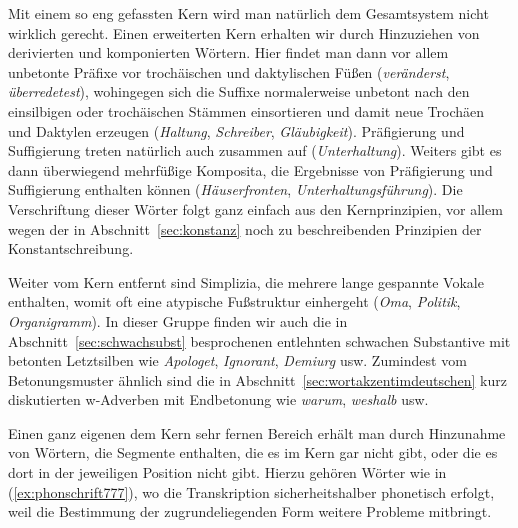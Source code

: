 Mit einem so eng gefassten Kern wird man natürlich dem Gesamtsystem nicht wirklich gerecht.
Einen erweiterten Kern erhalten wir durch Hinzuziehen von derivierten und komponierten Wörtern.
Hier findet man dann vor allem unbetonte Präfixe vor trochäischen und daktylischen Füßen (\textit{veränderst}, \textit{überredetest}), wohingegen sich die Suffixe normalerweise unbetont nach den einsilbigen oder trochäischen Stämmen einsortieren und damit neue Trochäen und Daktylen erzeugen (\textit{Haltung}, \textit{Schreiber}, \textit{Gläubigkeit}).
Präfigierung und Suffigierung treten natürlich auch zusammen auf (\textit{Unterhaltung}).
Weiters gibt es dann überwiegend mehrfüßige Komposita, die Ergebnisse von Präfigierung und Suffigierung enthalten können (\textit{Häuserfronten}, \textit{Unterhaltungsführung}).
Die Verschriftung dieser Wörter folgt ganz einfach aus den Kernprinzipien, vor allem wegen der in Abschnitt~\ref{sec:konstanz} noch zu beschreibenden Prinzipien der Konstantschreibung.

Weiter vom Kern entfernt sind Simplizia, die mehrere lange gespannte Vokale enthalten, womit oft eine atypische Fußstruktur einhergeht (\textit{Oma}, \textit{Politik}, \textit{Organigramm}).
In dieser Gruppe finden wir auch die in Abschnitt~\ref{sec:schwachsubst} besprochenen entlehnten schwachen Substantive mit betonten Letztsilben wie \textit{Apologet}, \textit{Ignorant}, \textit{Demiurg} usw.
Zumindest vom Betonungsmuster ähnlich sind die in Abschnitt~\ref{sec:wortakzentimdeutschen} kurz diskutierten w-Adverben mit Endbetonung wie \textit{warum}, \textit{weshalb} usw.

Einen ganz eigenen dem Kern sehr fernen Bereich erhält man durch Hinzunahme von Wörtern, die Segmente enthalten, die es im Kern gar nicht gibt, oder die es dort in der jeweiligen Position nicht gibt.
Hierzu gehören Wörter wie in (\ref{ex:phonschrift777}), wo die Transkription sicherheitshalber phonetisch erfolgt, weil die Bestimmung der zugrundeliegenden Form weitere Probleme mitbringt.

\begin{exe}
  \ex\label{ex:phonschrift777}
  \begin{xlist}
  \end{xlist}
\end{exe}

